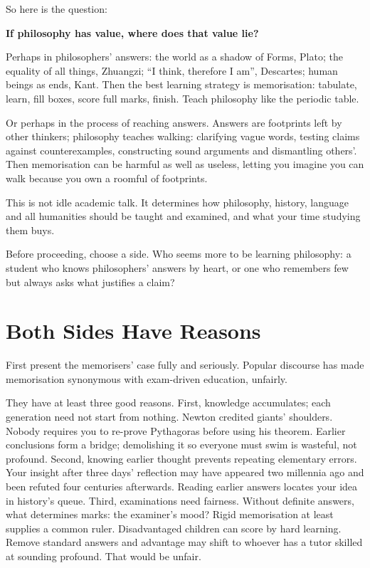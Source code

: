 So here is the question:

\textbf{If philosophy has value, where does that value lie?}

Perhaps in philosophers' answers: the world as a shadow of Forms, Plato; the equality of all things, Zhuangzi; ``I think, therefore I am'', Descartes; human beings as ends, Kant. Then the best learning strategy is memorisation: tabulate, learn, fill boxes, score full marks, finish. Teach philosophy like the periodic table.

Or perhaps in the process of reaching answers. Answers are footprints left by other thinkers; philosophy teaches walking: clarifying vague words, testing claims against counterexamples, constructing sound arguments and dismantling others'. Then memorisation can be harmful as well as useless, letting you imagine you can walk because you own a roomful of footprints.

This is not idle academic talk. It determines how philosophy, history, language and all humanities should be taught and examined, and what your time studying them buys.

Before proceeding, choose a side. Who seems more to be learning philosophy: a student who knows philosophers' answers by heart, or one who remembers few but always asks what justifies a claim?

\section{Both Sides Have Reasons}
First present the memorisers' case fully and seriously. Popular discourse has made memorisation synonymous with exam-driven education, unfairly.

They have at least three good reasons. First, knowledge accumulates; each generation need not start from nothing. Newton credited giants' shoulders. Nobody requires you to re-prove Pythagoras before using his theorem. Earlier conclusions form a bridge; demolishing it so everyone must swim is wasteful, not profound. Second, knowing earlier thought prevents repeating elementary errors. Your insight after three days' reflection may have appeared two millennia ago and been refuted four centuries afterwards. Reading earlier answers locates your idea in history's queue. Third, examinations need fairness. Without definite answers, what determines marks: the examiner's mood? Rigid memorisation at least supplies a common ruler. Disadvantaged children can score by hard learning. Remove standard answers and advantage may shift to whoever has a tutor skilled at sounding profound. That would be unfair.


